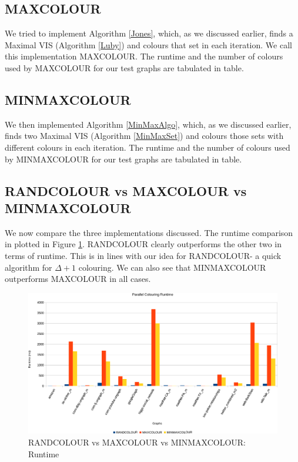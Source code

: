 \documentclass[MTech]{iitmdiss}
\begin{document}
\subsection{MAXCOLOUR}
We tried to implement Algorithm \ref{Jones}, which, as we discussed earlier, finds a Maximal VIS (Algorithm \ref{Luby}) and colours that set in each iteration. We call this implementation MAXCOLOUR. The runtime and the number of colours used by MAXCOLOUR for our test graphs are tabulated in table.

\subsection{MINMAXCOLOUR}
We then implemented Algorithm \ref{MinMaxAlgo}, which, as we discussed earlier, finds two Maximal VIS (Algorithm \ref{MinMaxSet}) and colours those sets with different colours in each iteration. The runtime and the number of colours used by MINMAXCOLOUR for our test graphs are tabulated in table.

\subsection{RANDCOLOUR vs MAXCOLOUR vs MINMAXCOLOUR}
We now compare the three implementations discussed. The runtime comparison in plotted in Figure \ref{fig:chart4}. RANDCOLOUR clearly outperforms the other two in terms of runtime. This is in lines with our idea for RANDCOLOUR- a quick algorithm for $\Delta+1$ colouring. We can also see that MINMAXCOLOUR outperforms MAXCOLOUR in all cases. 

\begin{figure}[h]
    \centering
    \includegraphics[width=\textwidth,keepaspectratio=true]{chartNewest4.pdf}
    \caption{
        RANDCOLOUR vs MAXCOLOUR vs MINMAXCOLOUR: Runtime
    }
    \label{fig:chart4}
\end{figure}
\end{document}

